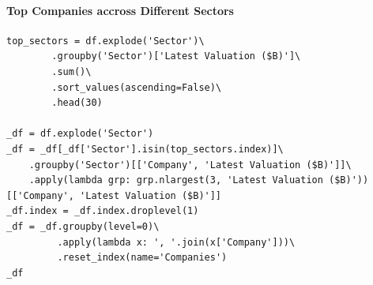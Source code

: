 \documentclass[a4paper,12pt]{article}
\begin{document}
\newpage
\paragraph{Top Companies accross Different Sectors}
\label{sec:org6b0667e}

\begin{verbatim}
top_sectors = df.explode('Sector')\
        .groupby('Sector')['Latest Valuation ($B)']\
        .sum()\
        .sort_values(ascending=False)\
        .head(30)

_df = df.explode('Sector')
_df = _df[_df['Sector'].isin(top_sectors.index)]\
    .groupby('Sector')[['Company', 'Latest Valuation ($B)']]\
    .apply(lambda grp: grp.nlargest(3, 'Latest Valuation ($B)'))[['Company', 'Latest Valuation ($B)']]
_df.index = _df.index.droplevel(1)
_df = _df.groupby(level=0)\
         .apply(lambda x: ', '.join(x['Company']))\
         .reset_index(name='Companies')
_df
\end{verbatim}
\end{document}
